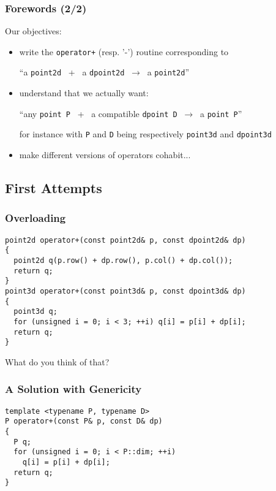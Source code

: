 \documentclass{beamer}
\newcommand{\code}[1]{{\scriptsize{\texttt{#1}}}\xspace}
\begin{document}
\begin{frame}
  \frametitle{Forewords (2/2)}

Our objectives:

\begin{itemize}
\item write the \code{operator+} (resp. '-') routine corresponding to\\
  \begin{center}
    ``a \code{point2d} ~+~ a \code{dpoint2d} $~\rightarrow~$ a \code{point2d}''
  \end{center}
\item understand that we actually want:\\
  \begin{center}
    ``any \code{point P} ~+~ a compatible \code{dpoint D} $~\rightarrow~$ a \code{point P}''
  \end{center}
  \scriptsize{for instance with \code{P} and \code{D} being
    respectively \code{point3d} and \code{dpoint3d}}
\item make different versions of operators cohabit...
\end{itemize}

\end{frame}



\subsection{First Attempts}


\begin{frame}[fragile]
  \frametitle{Overloading}

\begin{lstlisting}
point2d operator+(const point2d& p, const dpoint2d& dp)
{
  point2d q(p.row() + dp.row(), p.col() + dp.col());
  return q;
}
point3d operator+(const point3d& p, const dpoint3d& dp)
{
  point3d q;
  for (unsigned i = 0; i < 3; ++i) q[i] = p[i] + dp[i];
  return q;
}
\end{lstlisting}

What do you think of that?

\end{frame}



\begin{frame}[fragile]
  \frametitle{A Solution with Genericity}

\begin{lstlisting}
template <typename P, typename D>
P operator+(const P& p, const D& dp)
{
  P q;
  for (unsigned i = 0; i < P::dim; ++i)
    q[i] = p[i] + dp[i];
  return q;
}
\end{lstlisting}

\end{frame}
\end{document}
